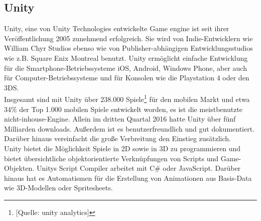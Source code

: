 \documentclass[extern,palatino]{cgBA}
\begin{document}
\newpage
\subsection{Unity}
Unity, eine von Unity Technologies entwickelte Game engine ist seit ihrer Veröffentlichung 2005 zunehmend erfolgreich. %
Sie wird von Indie-Entwicklern wie William Chyr Studios ebenso wie von Publisher-abhängigen Entwicklungsstudios wie z.B. Square Enix Montreal benutzt. Unity ermöglicht einfache Entwicklung für die Smartphone-Betriebssysteme iOS, Android, Windows Phone, aber auch für Computer-Betriebssysteme und für Konsolen wie die Playstation 4 oder den 3DS.
\\Insgesamt sind mit Unity über 238.000 Spiele\footnote{[Quelle: unity analytics]} für den mobilen Markt %
und etwa 34\% der Top 1.000 mobilen Spiele entwickelt worden, es ist die meistbenutzte nicht-inhouse-Engine. Allein im dritten Quartal 2016 hatte Unity über fünf Milliarden downloads. Außerdem ist es benutzerfreundlich und gut dokumentiert. Darüber hinaus vereinfacht die große Verbreitung den Einstieg zusätzlich.
\\Unity bietet die Möglichkeit Spiele in 2D sowie in 3D zu programmieren und bietet übersichtliche objektorientierte Verknüpfungen von Scripts und Game-Objekten. Unitys Script Compiler arbeitet mit C\# oder JavaScript. Darüber hinaus hat es Automatismen für die Erstellung von Animationen aus Basis-Data wie 3D-Modellen oder Spritesheets. 
\newpage 
\end{document}
